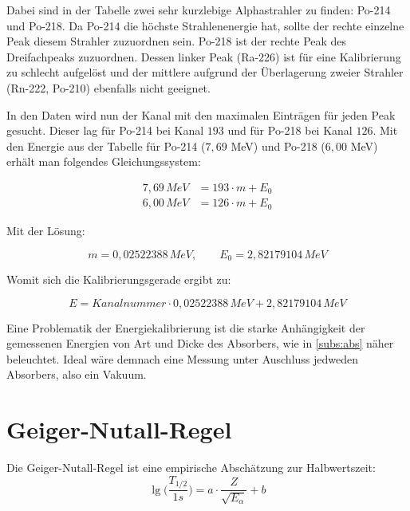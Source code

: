 Dabei sind in der Tabelle zwei sehr kurzlebige Alphastrahler zu finden: Po-214 und Po-218. Da Po-214 die höchste Strahlenenergie hat, 
sollte der rechte einzelne Peak diesem Strahler zuzuordnen sein. Po-218 ist der rechte Peak des Dreifachpeaks zuzuordnen. Dessen 
linker Peak (Ra-226) ist für eine Kalibrierung zu schlecht aufgelöst und der mittlere aufgrund der Überlagerung zweier Strahler 
(Rn-222, Po-210) ebenfalls nicht geeignet. \footnotemark
{}

In den Daten wird nun der Kanal mit den maximalen Einträgen für jeden Peak gesucht. Dieser lag für Po-214 bei Kanal $193$ und 
für Po-218 bei Kanal $126$. Mit den Energie aus der Tabelle für Po-214 ($7,69$ MeV) und Po-218 ($6,00$ MeV) erhält man folgendes 
Gleichungssystem:

\begin{align*}
    7,69 \, MeV &= 193 \cdot m + E_0 \\
    6,00 \, MeV &= 126 \cdot m + E_0
\end{align*}

Mit der Lösung:

\begin{equation*}
    m = 0,02522388 \, MeV, \qquad E_0 = 2,82179104 \, MeV
\end{equation*}

Womit sich die Kalibrierungsgerade ergibt zu:

\begin{equation}
    E = Kanalnummer \cdot 0,02522388 \, MeV + 2,82179104 \, MeV
\end{equation}

Eine Problematik der Energiekalibrierung ist die starke Anhängigkeit der gemessenen Energien von Art und Dicke des Absorbers, wie in 
\ref{subs:abs} näher beleuchtet. Ideal wäre demnach eine Messung unter Auschluss jedweden Absorbers, also ein Vakuum.\\





\section{Geiger-Nutall-Regel}

Die Geiger-Nutall-Regel ist eine empirische Abschätzung zur Halbwertszeit:\\
\begin{equation}
    \lg \biggl (\frac{T_{1/2}}{1s} \biggl ) = a \cdot \frac{Z}{\sqrt{E_{\alpha}}} + b
    \label{eq:gnr}
\end{equation}


